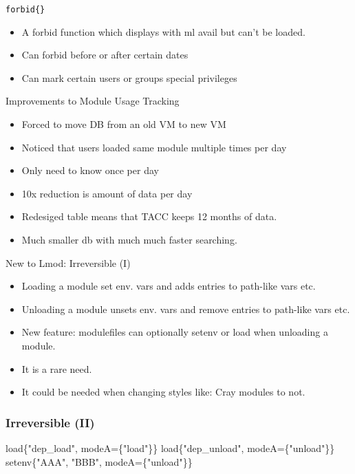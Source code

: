 \documentclass{beamer}
\begin{document}
\begin{frame}{\texttt{forbid\{\}}}
  \begin{itemize}
    \item A forbid function which displays with ml avail but can't be loaded.
    \item Can forbid before or after certain dates
    \item Can mark certain users or groups special privileges
  \end{itemize}
\end{frame}

\begin{frame}{Improvements to Module Usage Tracking}
  \begin{itemize}
    \item Forced to move DB from an old VM to new VM
    \item Noticed that users loaded same module multiple times per day
    \item Only need to know once per day
    \item 10x reduction is amount of data per day
    \item Redesiged table means that TACC keeps 12 months of data.
    \item Much smaller db with much much faster searching.
  \end{itemize}
\end{frame}

\begin{frame}{New to Lmod: Irreversible (I)}
  \begin{itemize}
    \item Loading a module set env. vars and adds entries to path-like
      vars etc. 
    \item Unloading a module unsets env. vars and remove entries to
      path-like vars  etc.
    \item New feature: modulefiles can optionally setenv or load when
      unloading a module.
    \item It is a rare need.
    \item It could be needed when changing styles like: Cray modules
      to not. 
  \end{itemize}
\end{frame}

\begin{frame}[fragile]
  \frametitle{Irreversible (II)}
    {\small
\begin{semiverbatim}
load\{"dep_load", modeA=\{"load"\}\}        
load\{"dep_unload", modeA=\{"unload"\}\}    
setenv\{"AAA", "BBB", modeA=\{"unload"\}\}  
\end{semiverbatim}
    }
\end{frame}
\end{document}
